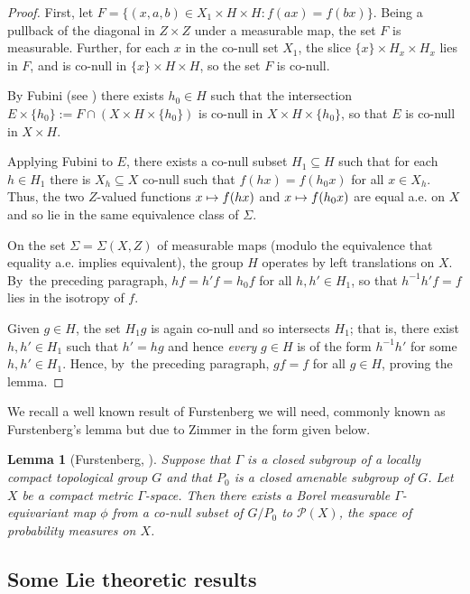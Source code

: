 \documentclass[10pt,a4paper]{amsart}
\def\mto{\mathchoice{\longmapsto}{\mapsto}{\mapsto}{\mapsto}}
\newtheorem{lemma}{Lemma}
\theoremstyle{definition}
\begin{document}
\begin{proof} First, let $F=\{(x,a,b)\in X_1\times H \times H: f(ax)=f(bx) \}$. Being a pullback of the diagonal in $Z\times Z$ under a measurable map, the set $F$ is measurable. Further, for each $x$ in the co-null set $X_1$, the slice $\{x\}\times H_x \times H_x$ lies in $F$, and is co-null in $\{x\}\times H\times H$, so the set $F$ is co-null.

By Fubini (see \cite[Th.\,A, p.\,147]{Hal}) there exists $h_0\in H$ such that the intersection $E\times\{h_0\}:=F\cap (X\times H\times\{h_0\})$ is co-null in $X\times H\times\{h_0\}$, so that $E$ is co-null in $X\times H$.

Applying Fubini to $E$, there exists a co-null subset $H_1\subseteq H$ such that for each $h\in H_1$ there is $X_h\subseteq X$ co-null such that $f(hx)=f(h_0x)$ for all $x\in X_h$. Thus, the two $Z$-valued functions $x\mto f(hx)$ and $x\mto f(h_0x)$ are equal a.e. on $X$ and so lie in the same equivalence class of $\Sigma$.

On the set $\Sigma =\Sigma (X,Z)$ of measurable maps (modulo the equivalence that equality a.e. implies equivalent), the group $H$ operates by left translations on $X$. By~the preceding paragraph, $h f =h'f=h_0f$ for all $h,h' \in H_1$, so that $h^{-1}h'f=f$ lies in the isotropy of $f$.

Given $g\in H$, the set $H_1g$ is again co-null and so intersects $H_1$; that is, there exist $h,h'\in H_1$ such that $h'=hg$ and hence \emph{every} $g\in H$ is of the form $h^{-1}h'$ for some $h,h'\in H_1$. Hence, by~the preceding paragraph, $gf=f$ for all $g\in H$, proving the lemma.
\end{proof}

We recall a well known result of Furstenberg we will need, commonly known as Furstenberg's lemma but due to Zimmer in the form given below.

\begin{lemma}[{Furstenberg, \cite[Cor.\,(4.3.7) \& Prop.\,(4.3.9)]{Z}}]\label{furstenberg}
Suppose that $\Gamma $ is a closed subgroup of a locally compact topological group $G$ and that $P_0$ is
a closed amenable subgroup of $G$. Let $X$ be a compact metric $\Gamma $-space. Then there exists a Borel measurable $\Gamma $-equivariant map $\phi$ from a co-null subset of $G/P_0$ to $\mathcal{P}(X)$, the space of probability
measures on $X$.
\end{lemma}

\subsection{Some Lie theoretic results}
\end{document}
